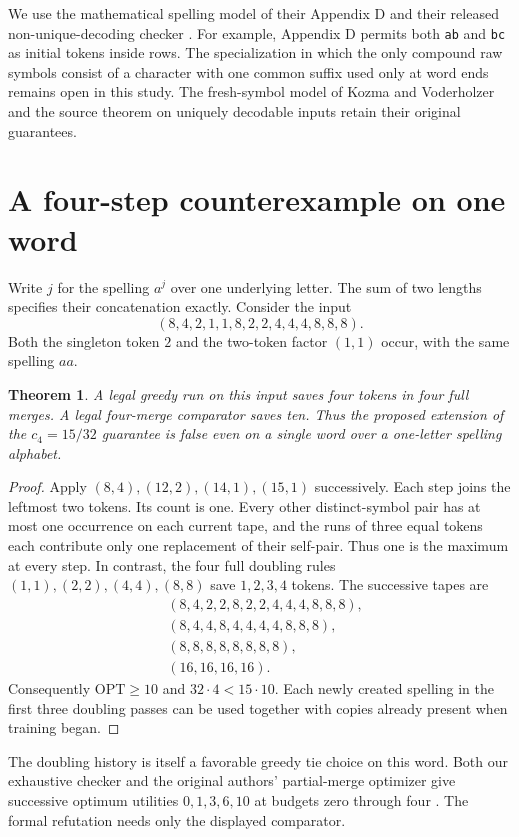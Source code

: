 \documentclass[11pt]{article}
\newtheorem{theorem}{Theorem}
\newcommand{\OPT}{\mathrm{OPT}}
\begin{document}
We use the mathematical spelling model of their Appendix D and their released non-unique-decoding checker \cite{supp}. For example, Appendix D permits both \texttt{ab} and \texttt{bc} as initial tokens inside rows. The specialization in which the only compound raw symbols consist of a character with one common suffix used only at word ends remains open in this study. The fresh-symbol model of Kozma and Voderholzer \cite{kv} and the source theorem on uniquely decodable inputs retain their original guarantees.

\section{A four-step counterexample on one word}
Write $j$ for the spelling $a^j$ over one underlying letter. The sum of two lengths specifies their concatenation exactly. Consider the input
\[
(8,4,2,1,1,8,2,2,4,4,4,8,8,8).
\]
Both the singleton token $2$ and the two-token factor $(1,1)$ occur, with the same spelling $aa$.

\begin{theorem}\label{th:finite}
A legal greedy run on this input saves four tokens in four full merges. A legal four-merge comparator saves ten. Thus the proposed extension of the $c_4=15/32$ guarantee is false even on a single word over a one-letter spelling alphabet.
\end{theorem}
\begin{proof}
Apply $(8,4),(12,2),(14,1),(15,1)$ successively. Each step joins the leftmost two tokens. Its count is one. Every other distinct-symbol pair has at most one occurrence on each current tape, and the runs of three equal tokens each contribute only one replacement of their self-pair. Thus one is the maximum at every step. In contrast, the four full doubling rules $(1,1),(2,2),(4,4),(8,8)$ save $1,2,3,4$ tokens. The successive tapes are
\[
\begin{aligned}
 &(8,4,2,2,8,2,2,4,4,4,8,8,8),\\
 &(8,4,4,8,4,4,4,4,8,8,8),\\
 &(8,8,8,8,8,8,8,8),\\
 &(16,16,16,16).
\end{aligned}
\]
Consequently $\OPT\ge10$ and $32\cdot4<15\cdot10$. Each newly created spelling in the first three doubling passes can be used together with copies already present when training began.
\end{proof}
The doubling history is itself a favorable greedy tie choice on this word. Both our exhaustive checker and the original authors' partial-merge optimizer give successive optimum utilities $0,1,3,6,10$ at budgets zero through four \cite{supp}. The formal refutation needs only the displayed comparator.
\end{document}
